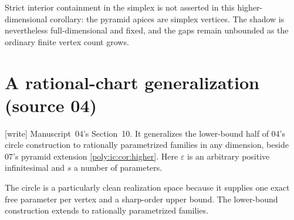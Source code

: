 \documentclass[11pt,a4paper]{article}
\numberwithin{equation}{section}
\theoremstyle{plain}
\newcommand{\wtag}{\textup{[write]}}%
\newcommand{\eps}{\varepsilon}
\begin{document}
Strict interior containment in the simplex is not asserted in this
higher-dimensional corollary: the pyramid apices are simplex vertices.
The shadow is nevertheless full-dimensional and fixed, and the gaps
remain unbounded as the ordinary finite vertex count grows.

\section{A rational-chart generalization (source 04)}\label{poly:bao:sec:charts}

\wtag{} Manuscript~04's Section~10. It generalizes the lower-bound half of
04's circle construction to rationally parametrized families in any
dimension, beside 07's pyramid extension \cref{poly:ic:cor:higher}. Here
$\eps$ is an arbitrary positive infinitesimal and $s$ a number of
parameters.

The circle is a particularly clean realization space because it supplies
one exact free parameter per vertex and a sharp-order upper bound. The
lower-bound construction extends to rationally parametrized families.
\end{document}
